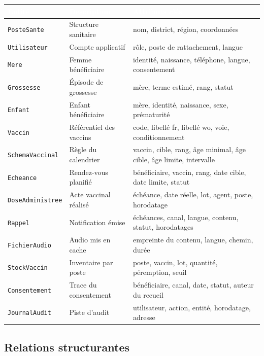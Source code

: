 \documentclass[11pt,a4paper]{article}
\newcommand{\hd}[1]{\textcolor{white}{\sffamily\bfseries\small #1}}
\newcommand{\rowhead}{\rowcolor{primary}}
\begin{document}
\begin{xltabular}{\textwidth}{@{}R{3.1cm} R{4.4cm} L@{}}
\toprule
\rowhead \hd{Entité} & \hd{Description} & \hd{Attributs clés} \\
\midrule \endhead
\texttt{PosteSante} & Structure sanitaire & nom, district, région, coordonnées \\
\texttt{Utilisateur} & Compte applicatif & rôle, poste de rattachement, langue \\
\texttt{Mere} & Femme bénéficiaire & identité, naissance, téléphone, langue, consentement \\
\texttt{Grossesse} & Épisode de grossesse & mère, terme estimé, rang, statut \\
\texttt{Enfant} & Enfant bénéficiaire & mère, identité, naissance, sexe, prématurité \\
\texttt{Vaccin} & Référentiel des vaccins & code, libellé fr, libellé wo, voie, conditionnement \\
\texttt{SchemaVaccinal} & Règle du calendrier & vaccin, cible, rang, âge minimal, âge cible, âge limite, intervalle \\
\texttt{Echeance} & Rendez-vous planifié & bénéficiaire, vaccin, rang, date cible, date limite, statut \\
\texttt{DoseAdministree} & Acte vaccinal réalisé & échéance, date réelle, lot, agent, poste, horodatage \\
\texttt{Rappel} & Notification émise & échéances, canal, langue, contenu, statut, horodatages \\
\texttt{FichierAudio} & Audio mis en cache & empreinte du contenu, langue, chemin, durée \\
\texttt{StockVaccin} & Inventaire par poste & poste, vaccin, lot, quantité, péremption, seuil \\
\texttt{Consentement} & Trace du consentement & bénéficiaire, canal, date, statut, auteur du recueil \\
\texttt{JournalAudit} & Piste d'audit & utilisateur, action, entité, horodatage, adresse \\
\bottomrule
\end{xltabular}

\subsection{Relations structurantes}
\end{document}
